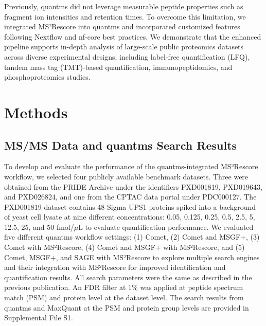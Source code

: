 \documentclass[12pt]{article}
\begin{document}
Previously, quantms did not leverage measurable peptide properties such as fragment ion intensities and retention times. To overcome this limitation, we integrated MS²Rescore into quantms and incorporated customized features following Nextflow and nf-core best practices. We demonstrate that the enhanced pipeline supports in-depth analysis of large-scale public proteomics datasets across diverse experimental designs, including label-free quantification (LFQ), tandem mass tag (TMT)-based quantification, immunopeptidomics, and phosphoproteomics studies.

\section{Methods}

\subsection{MS/MS Data and quantms Search Results}
To develop and evaluate the performance of the quantms-integrated MS²Rescore workflow, we selected four publicly available benchmark datasets. Three were obtained from the PRIDE Archive under the identifiers PXD001819, PXD019643, and PXD026824, and one from the CPTAC data portal under PDC000127. The PXD001819 dataset contains 48 Sigma UPS1 proteins spiked into a background of yeast cell lysate at nine different concentrations: 0.05, 0.125, 0.25, 0.5, 2.5, 5, 12.5, 25, and 50 fmol/$\mu$L to evaluate quantification performance. We evaluated five different quantms workflow settings: (1) Comet, (2) Comet and MSGF+, (3) Comet with MS²Rescore, (4) Comet and MSGF+ with MS²Rescore, and (5) Comet, MSGF+, and SAGE with MS²Rescore to explore multiple search engines and their integration with MS²Rescore for improved identification and quantification results. All search parameters were the same as described in the previous publication. An FDR filter at 1\% was applied at peptide spectrum match (PSM) and protein level at the dataset level. The search results from quantms and MaxQuant at the PSM and protein group levels are provided in Supplemental File S1.
\end{document}
